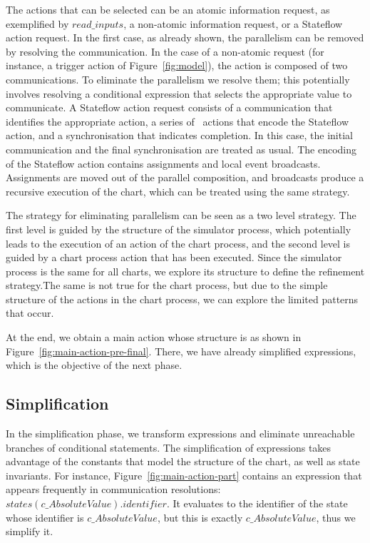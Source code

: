 \documentclass[submission]{eptcs}
\begin{document}
The actions that can be selected can be an atomic information request, as exemplified by $read\_inputs$, a non-atomic information request, or a Stateflow action request. In the first case, as already shown, the parallelism can be removed by resolving the communication. In the case of a non-atomic request (for instance, a trigger action of Figure~\ref{fig:model}), the action is composed of two communications. To eliminate the parallelism we resolve them; this potentially involves resolving a conditional expression that selects the appropriate value to communicate. A Stateflow action request consists of a communication that identifies the appropriate action, a series of \Circus~actions that encode the Stateflow action, and a synchronisation that indicates completion. In this case, the initial communication and the final synchronisation are treated as usual. The encoding of the Stateflow action contains assignments and local event broadcasts. Assignments are moved out of the parallel composition, and broadcasts produce a recursive execution of the chart, which can be treated using the same strategy.

The strategy for eliminating parallelism can be seen as a two level strategy. The first level is guided by the structure of the simulator process, which potentially leads to the execution of an action of the chart process, and the second level is guided by a chart process action that has been executed. Since the simulator process is the same for all charts, we explore its structure to define the refinement strategy.The same is not true for the chart process, but due to the simple structure of the actions in the chart process, we can explore the limited patterns that occur.

At the end, we obtain a main action whose structure is as shown in Figure~\ref{fig:main-action-pre-final}. There, we have already simplified expressions, which is the objective of the next phase.

\subsection{Simplification}

In the simplification phase, we transform expressions and eliminate unreachable branches of conditional statements. The simplification of expressions takes advantage of the constants that model the structure of the chart, as well as state invariants. For instance, Figure~\ref{fig:main-action-part} contains an expression that appears frequently in communication resolutions: $states(c\_AbsoluteValue).identifier$. It evaluates to the identifier of the state whose identifier is $c\_AbsoluteValue$, but this is exactly $c\_AbsoluteValue$, thus we simplify it. 
\end{document}
